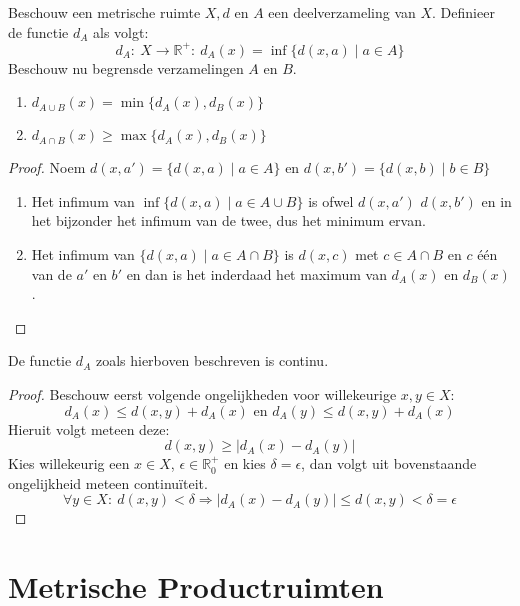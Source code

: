 \documentclass[main.tex]{subfiles}
\begin{document}
\begin{st}
  Beschouw een metrische ruimte $X,d$ en $A$ een deelverzameling van $X$.
  Definieer de functie $d_{A}$ als volgt:
  \[ d_{A}:\ X \rightarrow \mathbb{R}^{+}:\ d_{A}(x) = \inf\{d(x,a) \mid a\in A\} \]
  Beschouw nu begrensde verzamelingen $A$ en $B$.
  \begin{enumerate}
  \item $d_{A\cup B}(x) = \min\{d_{A}(x),d_{B}(x)\}$
  \item $d_{A\cap B}(x) \ge \max\{d_{A}(x),d_{B}(x)\}$
  \end{enumerate}

  \begin{proof}
    \noindent
    Noem $d(x,a') = \{d(x,a) \mid a\in A\}$ en $d(x,b') = \{d(x,b) \mid b\in B\}$
    \begin{enumerate}
    \item Het infimum van $\inf\{d(x,a) \mid a\in A\cup B\}$ is ofwel $d(x,a')$ $d(x,b')$ en in het bijzonder het infimum van de twee, dus het minimum ervan.
    \item Het infimum van $\{d(x,a) \mid a\in A\cap B\}$ is $d(x,c)$ met $c\in A\cap B$ en $c$ \'e\'en van de $a'$ en $b'$ en dan is het inderdaad het maximum van $d_{A}(x)$ en $d_{B}(x)$.
    \end{enumerate}
  \end{proof}
\end{st}

\begin{st}
  De functie $d_{A}$ zoals hierboven beschreven is continu.
  
  \begin{proof}
    Beschouw eerst volgende ongelijkheden voor willekeurige $x,y\in X$:
    \[ d_{A}(x) \le d(x,y) + d_{A}(x) \text{ en } d_{A}(y) \le d(x,y) + d_{A}(x) \]
    Hieruit volgt meteen deze:
    \[ d(x,y) \ge |d_{A}(x)-d_{A}(y)| \]
    Kies willekeurig een $x\in X$, $\epsilon \in \mathbb{R}_{0}^{+}$ en kies $\delta = \epsilon$, dan volgt uit bovenstaande ongelijkheid meteen continu\"iteit.
    \[ \forall y\in X:\ d(x,y) < \delta \Rightarrow |d_{A}(x)-d_{A}(y)| \le d(x,y) < \delta = \epsilon \]
    \feed
  \end{proof}
\end{st}

\section{Metrische Productruimten}
\label{sec:metrische-productruimten}
\end{document}
